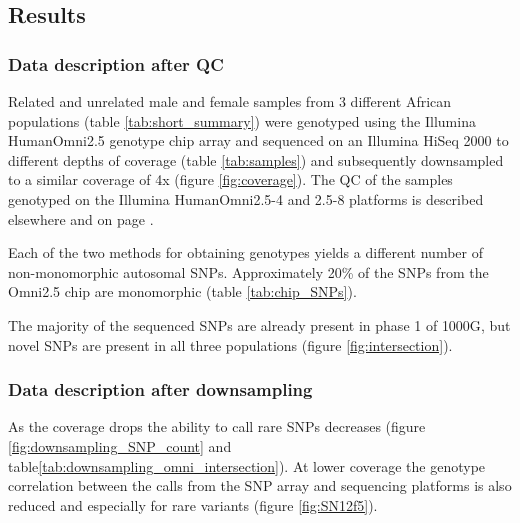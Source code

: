 \subsection{Results}

\subsubsection{Data description after QC}
\label{sec:agv_data_description}
Related and unrelated male and female samples from 3 different African populations (table \ref{tab:short_summary}) were genotyped using the Illumina HumanOmni2.5 genotype chip array and sequenced on an Illumina HiSeq 2000 to different depths of coverage (table \ref{tab:samples}) and subsequently downsampled to a similar coverage of 4x (figure \ref{fig:coverage}). The \gls{QC} of the samples genotyped on the Illumina HumanOmni2.5-4 and 2.5-8 platforms is described elsewhere\cite{Gurdasani2015} and on page \pageref{subsec:chipQC}.


Each of the two methods for obtaining genotypes yields a different number of non-monomorphic autosomal SNPs. Approximately 20\% of the SNPs from the Omni2.5 chip are monomorphic (table \ref{tab:chip_SNPs}).

The majority of the sequenced \glspl{SNP} are already present in phase 1 of \gls{1000G}\cite{1000G2012}, but novel SNPs are present in all three populations (figure \ref{fig:intersection}).


\subsubsection{Data description after downsampling}

As the coverage drops the ability to call rare \glspl{SNP} decreases (figure \ref{fig:downsampling_SNP_count} and table\ref{tab:downsampling_omni_intersection}). At lower coverage the genotype correlation between the calls from the SNP array and sequencing platforms is also reduced and especially for rare variants (figure \ref{fig:SN12f5}).


